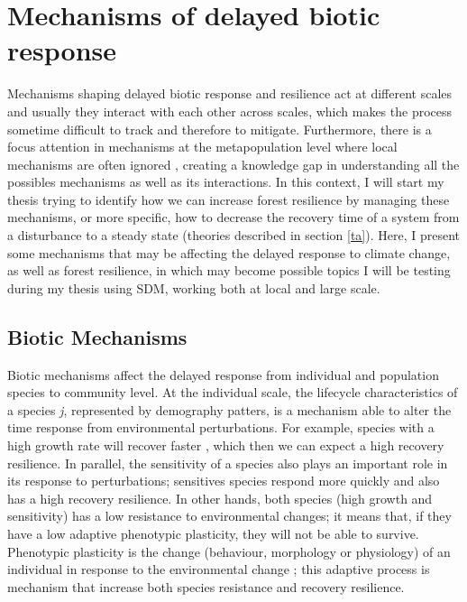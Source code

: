 \section{Mechanisms of delayed biotic response}

Mechanisms shaping delayed biotic response and resilience act at different scales and usually they interact with each other across scales, which makes the process sometime difficult to track and therefore to mitigate.
Furthermore, there is a focus attention in mechanisms at the metapopulation level where local mechanisms are often ignored \citep{Hylander2013}, creating a knowledge gap in understanding all the possibles mechanisms as well as its interactions.
In this context, I will start my thesis trying to identify how we can increase forest resilience by managing these mechanisms, or more specific, how to decrease the recovery time of a system from a disturbance to a steady state (theories described in section \ref{ta}).
Here, I present some mechanisms that may be affecting the delayed response to climate change, as well as forest resilience, in which may become possible topics I will be testing during my thesis using SDM, working both at local and large scale.

\subsection{Biotic Mechanisms}

Biotic mechanisms affect the delayed response from individual and population species to community level.
At the individual scale, the lifecycle characteristics of a species \textit{j}, represented by demography patters, is a mechanism able to alter the time response from environmental perturbations.
For example, species with a high growth rate will recover faster \citep{Grman2010}, which then we can expect a high recovery resilience.
In parallel, the sensitivity of a species also plays an important role in its response to perturbations; sensitives species respond more quickly and also has a high recovery resilience.
In other hands, both species (high growth and sensitivity) has a low resistance to environmental changes; it means that, if they have a low adaptive phenotypic plasticity, they will not be able to survive.
Phenotypic plasticity is the change (behaviour, morphology or physiology) of an individual in response to the environmental change \citep{Price2003}; this adaptive process is mechanism that increase both species resistance and recovery resilience.

